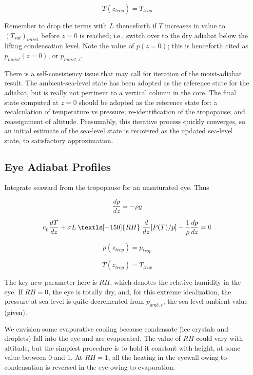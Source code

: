 \documentclass[preprint, prX]{revtex4}
\newcommand{\dd}[2]{\frac{d#1}{d#2}}
\newcommand{\rh}{\:\textls[-150]{RH}\:}
\newcommand{\ztrop}{z_{trop}}
\begin{document}
\begin{equation}
	T(\ztrop ) = T_{trop}
\end{equation}

Remember to drop the terms with $L$ thenceforth if $T$ increases in value to $(T_{sat})_{onset}$ before $z=0$ is reached; i.e., switch over to the dry adiabat below the lifting condensation level. Note the value of $p(z=0)$; this is henceforth cited as $p_{moist}(z=0)$, or $p_{moist,s}$.

There is a self-consistency issue that may call for iteration of the moist-adiabat result. The ambient-sea-level state has been adopted as the reference state for the adiabat, but is really not pertinent to a vertical column in the core. The final state computed at $z=0$ should be adopted as the reference state for: a recalculation of temperature vs pressure; re-identification of the tropopause; and reassignment of altitude. Presumably, this iterative process quickly converges, so an initial estimate of the sea-level state is recovered as the updated sea-level state, to satisfactory approximation.

\subsection{Eye Adiabat Profiles}

Integrate seaward from the tropopause for an unsaturated eye. Thus

\begin{equation}
	\dd{p}{z} = - \rho g
\end{equation}

\begin{equation}
	c_p \dd{T}{z} + \sigma L \rh \dd{}{z} [ P(T) / p] - \frac{1}{\rho} \dd{p}{z} = 0
\end{equation}

\begin{equation}
	p(\ztrop) = p_{trop} 
\end{equation}

\begin{equation}
	T(\ztrop ) = T_{trop}
\end{equation}

The key new parameter here is $RH$, which denotes the relative humidity in the eye. If $RH=0$, the eye is totally dry, and, for this extreme idealization, the pressure at sea level is quite decremented from $p_{amb,s}$, the sea-level ambient value (given).

We envision some evaporative cooling because condensate (ice crystals and droplets) fall into the eye and are evaporated. The value of $RH$ could vary with altitude, but the simplest procedure is to hold it constant with height, at some value between 0 and 1. At $RH=1$, all the heating in the eyewall owing to condensation is reversed in the eye owing to evaporation.
\end{document}
